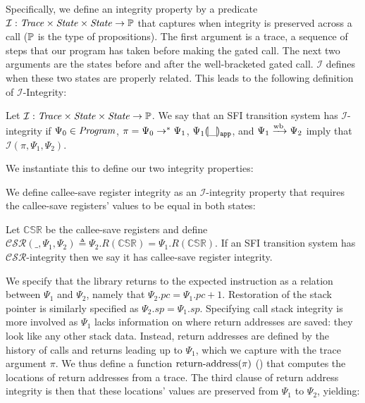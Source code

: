 Specifically, we define an integrity property by a predicate $\mathcal{I} :
\mathit{Trace} \times \mathit{State} \times \mathit{State} \rightarrow \mathbb{P}$
that captures when integrity is preserved across a call ($\mathbb{P}$ is the type of
propositions).
%
The first argument is a trace, a sequence of steps that our program has taken
before making the gated call.
%
The next two arguments are the states before and after the well-bracketed gated
call.
%
$\mathcal{I}$ defines when these two states are properly related.
%
This leads to the following definition of $\mathcal{I}$-Integrity:

\begin{definition}
  Let $\mathcal{I} : \mathit{Trace} \times \mathit{State} \times \mathit{State} \rightarrow \mathbb{P}$.
  We say that an SFI transition system has $\mathcal{I}$-integrity if
  $\Psi_0 \in \mathit{Program}$, $\pi = \Psi_0 \mathrel{\mathrel{\rightarrow}^{\ast}} \Psi_1$,
  ${\Psi_1}\llparenthesis{\_}\rrparenthesis_{\mathtt{app}}$, and $\Psi_1 \mathrel{\xrightarrow{\!\text{wb}}} \Psi_2$ imply that
  $\mathcal{I}(\pi, \Psi_1, \Psi_2)$.
\end{definition}

\noindent
We instantiate this to define our two integrity properties:

%
We define callee-save register integrity as an $\mathcal{I}$-integrity property
that requires the callee-save registers' values to be equal in both states:
%
\begin{definition}
  Let $\mathbb{CSR}$ be the callee-save registers and define
  $\mathcal{CSR}(\_, \Psi_1, \Psi_2) \triangleq \Psi_2.R(\mathbb{CSR}) = \Psi_1.R(\mathbb{CSR})$.
  If an SFI transition system has $\mathcal{CSR}$-integrity then we say it has callee-save register integrity.
\end{definition}

%
We specify that the library returns to the expected instruction as a relation
between $\Psi_1$ and $\Psi_2$, namely that $\Psi_2.pc = \Psi_1.pc + 1$.
%
Restoration of the stack pointer is similarly specified as
$\Psi_2.sp = \Psi_1.sp$.
%
Specifying call stack integrity is more involved as $\Psi_1$ lacks information
on where return addresses are saved: they look like any other stack data.
%
Instead, return addresses are defined by the history of calls and returns
leading up to $\Psi_1$, which we capture with the trace argument $\pi$.
%
We thus define a function $\operatorname{return-address}(\pi)$ () that computes the locations of
return addresses from a trace.
%
The third clause of return address integrity
is then that these locations' values are
preserved from $\Psi_1$ to $\Psi_2$, yielding:

